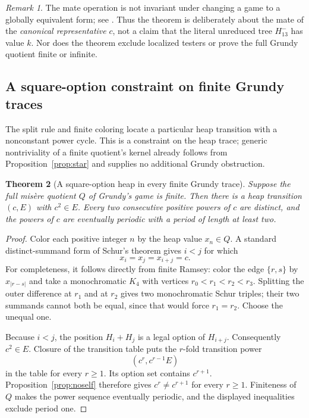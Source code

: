 \documentclass[11pt]{article}
\newtheorem{theorem}{Theorem}[section]
\theoremstyle{definition}
\theoremstyle{remark}
\newtheorem{remark}[theorem]{Remark}
\begin{document}
\begin{remark}
The mate operation is not invariant under changing a game to a globally
equivalent form; see \cite[Section~3]{siegelelements2021}.  Thus the theorem
is deliberately about the mate of the \emph{canonical representative}
$c$, not a claim that the literal unreduced tree $H_{13}^{-}$ has value
$k$.  Nor does the theorem exclude localized testers or prove the full
Grundy quotient finite or infinite.
\end{remark}

\subsection{A square-option constraint on finite Grundy traces}

The split rule and finite coloring locate a particular heap transition with
a nonconstant power cycle.  This is a constraint on the heap trace; generic
nontriviality of a finite quotient's kernel already follows from
Proposition~\ref{prop:star} and supplies no additional Grundy obstruction.

\begin{theorem}[A square-option heap in every finite Grundy trace]
\label{thm:grundy-square}
Suppose the full mis\`ere quotient $Q$ of Grundy's game is finite.  Then there
is a heap transition $(c,E)$ with $c^2\in E$.  Every two consecutive positive
powers of $c$ are distinct, and the powers of $c$ are eventually periodic
with a period of length at least two.
\end{theorem}

\begin{proof}
Color each positive integer $n$ by the heap value $x_n\in Q$.  A standard
distinct-summand form of Schur's theorem gives $i<j$ for which
\[
 x_i=x_j=x_{i+j}=c.
\]
For completeness, it follows directly from finite Ramsey: color the edge
$\{r,s\}$ by $x_{|r-s|}$ and take a monochromatic $K_4$ with vertices
$r_0<r_1<r_2<r_3$.  Splitting the outer difference at $r_1$ and at $r_2$
gives two monochromatic Schur triples; their two summands cannot both be
equal, since that would force $r_1=r_2$.  Choose the unequal one.

Because $i<j$, the position $H_i+H_j$ is a legal option of $H_{i+j}$.
Consequently $c^2\in E$.  Closure of the transition table puts the
$r$-fold transition power
\[
 (c^r,c^{r-1}E)
\]
in the table for every $r\ge1$.  Its option set contains $c^{r+1}$.
Proposition~\ref{prop:noself} therefore gives
$c^r\ne c^{r+1}$ for every $r\ge1$.  Finiteness of $Q$ makes the power
sequence eventually periodic, and the displayed inequalities exclude
period one.

\end{proof}
\end{document}
